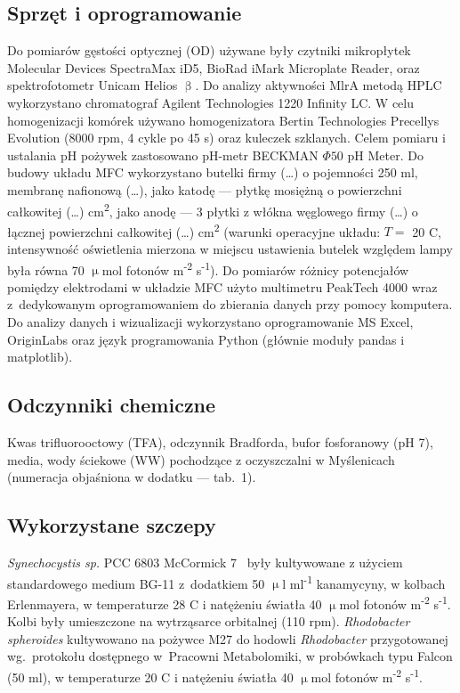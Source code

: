 \subsection{Sprzęt i oprogramowanie}\label{subsec:sprzet}
Do pomiarów gęstości optycznej (OD) używane były czytniki mikropłytek
Molecular Devices SpectraMax iD5, BioRad iMark
Microplate Reader, oraz spektrofotometr Unicam Helios $\upbeta$.
Do analizy aktywności MlrA metodą HPLC wykorzystano chromatograf
Agilent Technologies 1220 Infinity LC\@.
W celu homogenizacji komórek używano homogenizatora
Bertin Technologies Precellys Evolution (8000 rpm, 4 cykle po 45 s)
oraz kuleczek szklanych.
Celem pomiaru i ustalania pH pożywek zastosowano pH-metr
BECKMAN $\Phi 50$ pH Meter.
Do budowy układu MFC wykorzystano butelki firmy (\ldots)
o pojemności 250 ml, membranę nafionową (\ldots),
jako katodę — płytkę mosiężną o powierzchni całkowitej (\ldots)
cm\textsuperscript{2}, jako anodę — 3 płytki z włókna węglowego firmy
(\ldots) o łącznej powierzchni całkowitej (\ldots) cm\textsuperscript{2}
(warunki operacyjne układu:
$T =$ 20 \degree C, intensywność oświetlenia mierzona w miejscu
ustawienia butelek względem lampy była równa
70 $\upmu$mol fotonów m\textsuperscript{-2} s\textsuperscript{-1}).
Do pomiarów różnicy potencjałów pomiędzy elektrodami
w układzie MFC użyto multimetru PeakTech 4000 wraz
z~dedykowanym oprogramowaniem do zbierania danych przy pomocy komputera.
Do analizy danych i wizualizacji wykorzystano oprogramowanie
MS Excel, OriginLabs oraz język programowania Python
(głównie moduły pandas i matplotlib).

\subsection{Odczynniki chemiczne}\label{subsec:odczynniki}
Kwas trifluorooctowy (TFA), odczynnik Bradforda, bufor fosforanowy (pH 7),
media, wody ściekowe (WW) pochodzące z oczyszczalni w Myślenicach
(numeracja objaśniona w dodatku — tab.\ 1).

\subsection{Wykorzystane szczepy}\label{subsec:szczepy}
\textit{Synechocystis sp.} PCC 6803 McCormick 7~\cite{Puchalski2021}
były kultywowane z użyciem standardowego medium BG-11 z~dodatkiem 50
$\upmu$l ml\textsuperscript{-1} kanamycyny, w kolbach Erlenmayera,
w temperaturze 28 \degree C i natężeniu światła
40 $\upmu$mol fotonów m\textsuperscript{-2} s\textsuperscript{-1}.
Kolbi były umieszczone na wytrząsarce orbitalnej (110 rpm).
\textit{Rhodobacter spheroides} kultywowano na pożywce M27
do hodowli \textit{Rhodobacter} przygotowanej wg.\ protokołu
dostępnego w~Pracowni Metabolomiki, w probówkach typu
Falcon (50 ml), w temperaturze 20 \degree C i natężeniu światła
40 $\upmu$mol fotonów m\textsuperscript{-2} s\textsuperscript{-1}.

